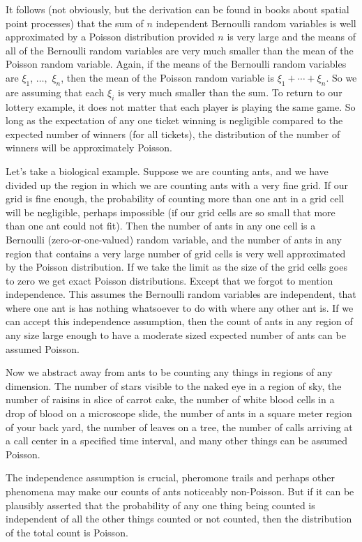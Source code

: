 It follows (not obviously, but the derivation can be found in books
about spatial point processes) that the sum of $n$ independent Bernoulli
random variables is well approximated by a Poisson distribution provided
$n$ is very large and the means of all of the Bernoulli random variables
are very much smaller than the mean of the Poisson random variable.
Again, if the means of the Bernoulli random variables
are $\xi_1$, $\ldots,$ $\xi_n$, then the mean of the Poisson random variable
is $\xi_1 + \cdots + \xi_n$.  So we are assuming that each $\xi_i$ is very
much smaller than the sum.  To return to our lottery example, it does not
matter that each player is playing the same game.  So long as the expectation
of any one ticket winning is negligible compared to the expected number of
winners (for all tickets), the distribution of the number of winners will
be approximately Poisson.

Let's take a biological example.  Suppose we are counting ants, and we
have divided up the region in which we are counting ants with a very fine
grid.  If our grid is fine enough, the probability of counting more than one
ant in a grid cell will be negligible, perhaps impossible (if our grid cells
are so small that more than one ant could not fit).  Then the number of
ants in any one cell is a Bernoulli (zero-or-one-valued) random variable,
and the number of ants in any region that contains a very large number
of grid cells is very well approximated by the Poisson distribution.
If we take the limit as the size of the grid cells goes to zero we
get exact Poisson distributions.  Except that we forgot to mention
independence.  This assumes the Bernoulli random variables are independent,
that where one ant is has nothing whatsoever to do with where any other ant
is.  If we can accept this independence assumption, then the count of
ants in any region of any size large enough to have a moderate sized
expected number of ants can be assumed Poisson.

Now we abstract away from ants to be counting any things in regions of
any dimension.  The number of stars visible to the naked eye in a region
of sky, the number of raisins in slice of carrot cake, the number of white
blood cells in a drop of blood on a microscope slide, the number of ants
in a square meter region of your back yard, the number of leaves on a tree,
the number of calls arriving at a call center in a specified time interval,
and many other things can be assumed Poisson.

The independence assumption is crucial, pheromone trails and perhaps other
phenomena may make our counts of ants noticeably non-Poisson.  But if it
can be plausibly asserted that the probability of any one thing being counted
is independent of all the other things counted or not counted, then the
distribution of the total count is Poisson.

